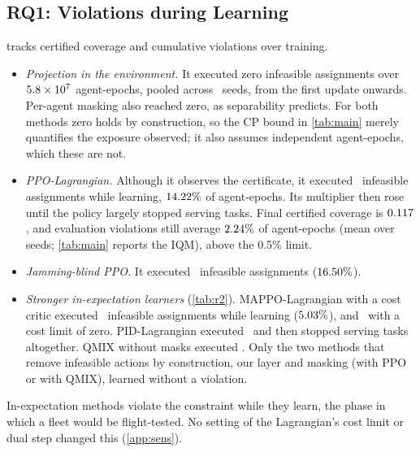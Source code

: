 \subsection{RQ1: Violations during Learning}
\label{sec:rq1}
 tracks certified coverage and cumulative violations over training.
\begin{itemize}[leftmargin=1.2em,itemsep=1pt,topsep=1pt]
\item \emph{Projection in the environment.} It executed zero infeasible assignments
  over $5.8\times10^{7}$ agent-epochs, pooled across \nNSeeds\ seeds, from the first update
  onwards. Per-agent masking also reached zero, as separability predicts. For both methods
  zero holds by construction, so the CP bound in \cref{tab:main} merely quantifies the
  exposure observed; it also assumes independent agent-epochs, which these are not.
\item \emph{PPO-Lagrangian.} Although it observes the certificate, it executed
  \nLagTrainViol\ infeasible assignments while learning, $14.22\%$ of agent-epochs.
  Its multiplier then rose until the policy largely stopped serving tasks. Final certified
  coverage is $0.117$, and evaluation violations still average $2.24\%$ of
  agent-epochs (mean over seeds; \cref{tab:main} reports the IQM), above the 0.5\% limit.
\item \emph{Jamming-blind PPO.} It executed \nBlindTrainViol\ infeasible assignments
  ($16.50\%$).
\item \emph{Stronger in-expectation learners} (\cref{tab:r2}). MAPPO-Lagrangian with a cost
  critic executed \nMLagTrainViol\ infeasible assignments while learning
  ($5.03\%$), and \nMLagZeroTrainViol\ with a cost limit of zero.
  PID-Lagrangian executed \nPidLagTrainViol\ and then stopped serving tasks altogether.
  QMIX without masks executed \nQmixTrainViol. Only the two methods that remove infeasible
  actions by construction, our layer and masking (with PPO or with QMIX), learned without a
  violation.
\end{itemize}
In-expectation methods violate the constraint while they learn, the phase in which a fleet
would be flight-tested. No setting of the Lagrangian's cost limit or dual step changed
this (\cref{app:sens}).

